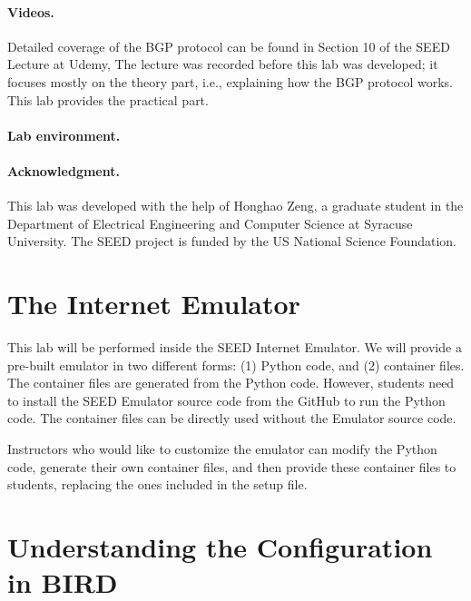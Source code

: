 \paragraph{Videos.}
Detailed coverage of the BGP protocol can be found in 
Section 10 of the SEED Lecture at Udemy, \seedisvideo 
The lecture was recorded before this lab was developed; 
it focuses mostly on the theory part, i.e., explaining how the BGP protocol works. 
This lab provides the practical part.  


\paragraph{Lab environment.} 
\seedenvironmentB
\nodependency


\paragraph{Acknowledgment.} 
This lab was developed with the help of Honghao Zeng, a graduate student
in the Department of Electrical Engineering and Computer Science at Syracuse University.
The SEED project is funded by the US National Science Foundation. 


\section{The Internet Emulator} 

This lab will be performed inside the SEED Internet Emulator. We will
provide a pre-built emulator in two different forms: (1) Python code,
and (2) container files. The container files are generated from
the Python code. However, students need to install the SEED Emulator source 
code from the GitHub to run the Python code. The container files
can be directly used without the Emulator source code. 

Instructors who would like to customize the emulator can modify the Python
code, generate their own container files, and then provide these
container files to students, replacing the ones included in the 
setup file. 



\section{Understanding the Configuration in BIRD} 

